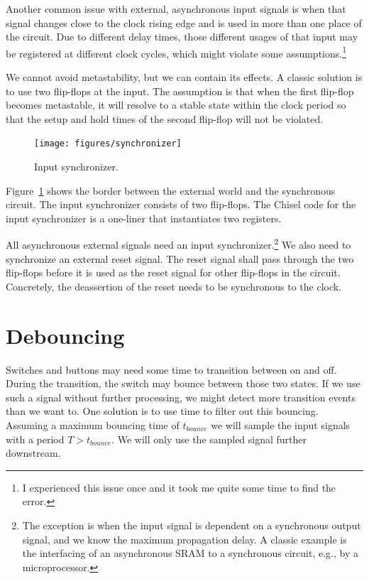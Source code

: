 \documentclass[%
    10pt,
    headinclude, footexclude,
    openright, %
    notitlepage,
    cleardoubleempty,
    headsepline,
    pointlessnumbers,
    bibtotoc, idxtotoc,
    ]{scrbook}
\begin{document}
Another common issue with external, asynchronous input signals is when
that signal changes close to the clock rising edge and is used in more than one
place of the circuit. Due to different delay times, those different usages of that
input may be registered at different clock cycles, which might violate
some assumptions.\footnote{I experienced this issue once and it took me
quite some time to find the error.}

We cannot avoid metastability, but we can contain its effects.
A classic solution is to use two flip-flops at the input. The assumption is that
when the first flip-flop becomes metastable, it will resolve to a stable
state within the clock period so that the setup and hold times of the
second flip-flop will not be violated.

\begin{figure}
  \centering
  \texttt{[image: figures/synchronizer]}
  \caption{Input synchronizer.}
  \label{fig:synchronizer}
\end{figure}

Figure~\ref{fig:synchronizer} shows the border between the external world
and the synchronous circuit. The input synchronizer consists of
two flip-flops. The Chisel code for the input synchronizer is a one-liner that
instantiates two registers.


All asynchronous external signals need an input
synchronizer.\footnote{The exception is when the input signal is dependent
on a synchronous output signal, and we know the maximum propagation delay.
A classic example is the interfacing of an asynchronous SRAM
to a synchronous circuit, e.g., by a microprocessor.}
We also need to synchronize an external reset signal. The reset signal
shall pass through the two flip-flops before it is used as the reset signal
for other flip-flops in the circuit. Concretely, the deassertion of the reset needs
to be synchronous to the clock.

\section{Debouncing}

Switches and buttons may need some time to transition between on and off.
During the transition, the switch may bounce between those two states.
If we use such a signal without further processing, we might detect more
transition events than we want to. One solution is to use time to filter out
this bouncing. Assuming a maximum bouncing time of $t_{bounce}$ we will sample the
input signals with a period $T > t_{bounce}$. We will only use the
sampled signal further downstream.
\end{document}
